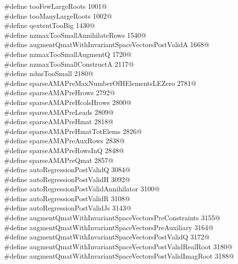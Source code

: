 \documentclass[12pt]{article}
\begin{document}
\begin{flushleft}
\begin{minipage}{\linewidth}
\begin{list}{}{}
\mbox{}\verb@#define tooFewLargeRoots 1001@\\
\mbox{}\verb@#define tooManyLargeRoots 1002@\\
\mbox{}\verb@#define qextentTooBig 1430@\\
\mbox{}\verb@#define nzmaxTooSmallAnnihilateRows 1540@\\
\mbox{}\verb@#define augmentQmatWithInvariantSpaceVectorsPostValidA 1668@\\
\mbox{}\verb@#define nzmaxTooSmallAugmentQ 1720@\\
\mbox{}\verb@#define nzmaxTooSmallConstructA 2117@\\
\mbox{}\verb@#define ndnsTooSmall 2180@\\
\mbox{}\verb@#define sparseAMAPreMaxNumberOfHElementsLEZero 2781@\\
\mbox{}\verb@#define sparseAMAPreHrows 2792@\\
\mbox{}\verb@#define sparseAMAPreHcolsHrows 2800@\\
\mbox{}\verb@#define sparseAMAPreLeads 2809@\\
\mbox{}\verb@#define sparseAMAPreHmat 2818@\\
\mbox{}\verb@#define sparseAMAPreHmatTotElems 2826@\\
\mbox{}\verb@#define sparseAMAPreAuxRows 2838@\\
\mbox{}\verb@#define sparseAMAPreRowsInQ 2848@\\
\mbox{}\verb@#define sparseAMAPreQmat 2857@\\
\mbox{}\verb@#define autoRegressionPostValidQ 3084@\\
\mbox{}\verb@#define autoRegressionPostValidH 3092@\\
\mbox{}\verb@#define autoRegressionPostValidAnnihilator 3100@\\
\mbox{}\verb@#define autoRegressionPostValidR 3108@\\
\mbox{}\verb@#define autoRegressionPostValidJs 3143@\\
\mbox{}\verb@#define augmentQmatWithInvariantSpaceVectorsPreConstraints 3155@\\
\mbox{}\verb@#define augmentQmatWithInvariantSpaceVectorsPreAuxiliary 3164@\\
\mbox{}\verb@#define augmentQmatWithInvariantSpaceVectorsPostValidQ 3172@\\
\mbox{}\verb@#define augmentQmatWithInvariantSpaceVectorsPostValidRealRoot 3180@\\
\mbox{}\verb@#define augmentQmatWithInvariantSpaceVectorsPostValidImagRoot 3188@\\

\end{list}
\end{minipage}
\end{flushleft}
\end{document}
